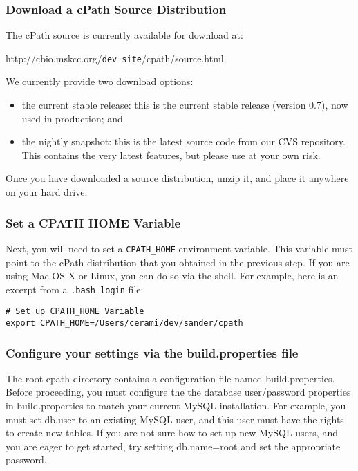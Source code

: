 \documentclass[letterpaper,12pt]{article}
\begin{document}
\subsubsection{Download a cPath Source Distribution}

The cPath source is currently available for download at: 

http://cbio.mskcc.org/\verb+dev_site+/cpath/source.html.

\bigskip

We currently provide two download options:

\begin{itemize}

\item the current stable release:  this is the current stable release (version 0.7), now used in production;  and

\item the nightly snapshot:  this is the latest source code from our CVS repository.  This contains the very latest features, but please use at your own risk.

\end{itemize}

Once you have downloaded a source distribution, unzip it, and place it anywhere on your hard drive.  

\subsubsection{Set a CPATH HOME Variable}

Next, you will need to set a \verb+CPATH_HOME+ environment variable. This variable must point to the cPath distribution that you obtained in the previous step.  If you are using Mac OS X or Linux, you can do so via the shell. For example, here is an excerpt from a \verb+.bash_login+ file:

\begin{verbatim}
# Set up CPATH_HOME Variable
export CPATH_HOME=/Users/cerami/dev/sander/cpath
\end{verbatim}

\subsubsection{Configure your settings via the build.properties file}

The root cpath directory contains a configuration file named build.properties.  Before proceeding, you must configure the the database user/password properties in build.properties to match your current MySQL installation.  For example, you must set db.user to an existing MySQL user, and this user must have the rights to create new tables.  If you are not sure how to set up new MySQL users, and you are eager to get started, try setting db.name=root and set the appropriate password.  
 
\end{document}
